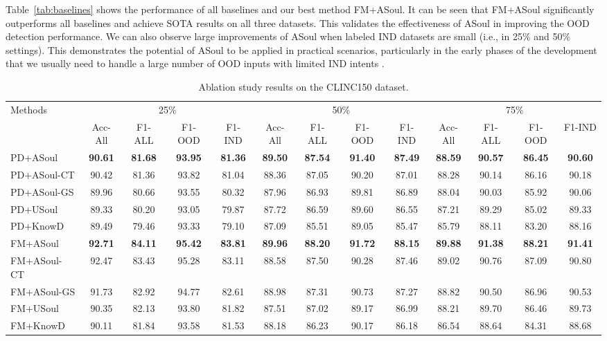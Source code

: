\documentclass[11pt]{article}
\begin{document}
Table~\ref{tab:baselines} shows the performance of all baselines and our best method FM+ASoul.
It can be seen that FM+ASoul significantly outperforms all baselines and achieve SOTA results on all three datasets.
This validates the effectiveness of ASoul in improving the OOD detection performance.
We can also observe large improvements of ASoul when labeled IND datasets are small  (i.e., in 25\% and 50\% settings).
This demonstrates the potential of ASoul to be applied in practical scenarios, 
particularly in the early phases of the development that we usually need to handle a large number of OOD inputs with limited IND intents \cite{zhan2021out}.

\begin{table}[t]
\small
\setlength\tabcolsep{1.0pt} %
\begin{tabular}{l|cccc|cccc|cccc}
\toprule
\multirow{2}{*}{Methods}    & \multicolumn{4}{c|}{25\%} & \multicolumn{4}{c|}{50\%} & \multicolumn{4}{c}{75\%} \\
                            & Acc-All & F1-ALL & F1-OOD & F1-IND & Acc-All & F1-ALL  & F1-OOD & F1-IND  & Acc-All & F1-ALL  & F1-OOD & F1-IND  \\
\midrule
PD+ASoul & \textbf{90.61} & \textbf{81.68} & \textbf{93.95} & \textbf{81.36} & \textbf{89.50}  & \textbf{87.54} & \textbf{91.40} & \textbf{87.49} & \textbf{88.59} & \textbf{90.57} & \textbf{86.45} & \textbf{90.60} \\
PD+ASoul-CT & 90.42 & 81.36 & 93.82 & 81.04 & 88.36 & 87.05 & 90.20 & 87.01 & 88.28 & 90.14 & 86.16 & 90.18 \\
PD+ASoul-GS & 89.96 & 80.66 & 93.55 & 80.32 & 87.96 & 86.93 & 89.81 & 86.89 & 88.04 & 90.03 & 85.92 & 90.06 \\
PD+USoul & 89.33 & 80.20 & 93.05 & 79.87 & 87.72  & 86.59 & 89.60 & 86.55 & 87.21 & 89.29 & 85.02 & 89.33 \\
PD+KnowD & 89.49 & 79.46 & 93.33 & 79.10 & 87.09 & 85.51 & 89.05 & 85.47 & 85.79 & 88.11 & 83.20 & 88.16\\
\midrule
FM+ASoul & \textbf{92.71} & \textbf{84.11} & \textbf{95.42} & \textbf{83.81} & \textbf{89.96} & \textbf{88.20} & \textbf{91.72} & \textbf{88.15} & \textbf{89.88} & \textbf{91.38} & \textbf{88.21} & \textbf{91.41} \\
FM+ASoul-CT & 92.47 & 83.43 & 95.28 & 83.11 &88.58 & 87.50 & 90.28 & 87.46 & 89.02& 90.76 & 87.09 & 90.80 \\
FM+ASoul-GS & 91.73 & 82.92 & 94.77 & 82.61 &88.98 & 87.31 & 90.73 & 87.27 &88.82 & 90.50 & 86.96 & 90.53 \\
FM+USoul & 90.35 & 82.13 & 93.80 & 81.82 &87.51& 87.02 & 89.17 & 86.99 &88.21& 89.70 & 86.46 & 89.73 \\
FM+KnowD & 90.11 & 81.84 & 93.58 & 81.53 & 88.18 & 86.23 & 90.17 & 86.18 & 86.54 & 88.64 & 84.31 & 88.68 \\
\bottomrule
\end{tabular}
\centering
\caption{Ablation study results on the CLINC150 dataset.}
\label{tab:ablation}
\end{table}
\end{document}
